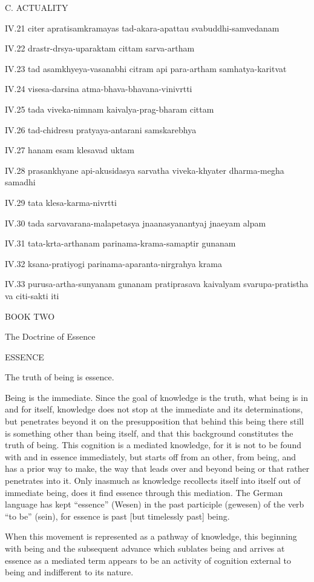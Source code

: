 

C. ACTUALITY

IV.21
citer apratisamkramayas tad-akara-apattau svabuddhi-samvedanam

IV.22
drastr-drsya-uparaktam cittam sarva-artham

IV.23
tad asamkhyeya-vasanabhi citram api para-artham samhatya-karitvat

IV.24
visesa-darsina atma-bhava-bhavana-vinivrtti

IV.25
tada viveka-nimnam kaivalya-prag-bharam cittam

IV.26
tad-chidresu pratyaya-antarani samskarebhya

IV.27
hanam esam klesavad uktam

IV.28
prasankhyane api-akusidasya sarvatha viveka-khyater dharma-megha samadhi

IV.29
tata klesa-karma-nivrtti

IV.30
tada sarvavarana-malapetasya jnaanasyanantyaj jnaeyam alpam

IV.31
tata-krta-arthanam parinama-krama-samaptir gunanam

IV.32
ksana-pratiyogi parinama-aparanta-nirgrahya krama

IV.33
purusa-artha-sunyanam gunanam pratiprasava kaivalyam
svarupa-pratistha va citi-sakti iti

BOOK TWO

The Doctrine of Essence

ESSENCE

The truth of being is essence.

Being is the immediate.
Since the goal of knowledge is the truth,
what being is in and for itself,
knowledge does not stop at the immediate and its determinations,
but penetrates beyond it on the presupposition that
behind this being there still is something other than being itself,
and that this background constitutes the truth of being.
This cognition is a mediated knowledge,
for it is not to be found with and in essence immediately,
but starts off from an other, from being,
and has a prior way to make,
the way that leads over and beyond being
or that rather penetrates into it.
Only inasmuch as knowledge recollects
itself into itself out of immediate being,
does it find essence through this mediation.
The German language has kept “essence” (Wesen)
in the past participle (gewesen) of the verb “to be” (sein),
for essence is past [but timelessly past] being.

When this movement is represented as a pathway of knowledge,
this beginning with being and the subsequent advance
which sublates being and arrives at essence as a mediated term
appears to be an activity of cognition external to being
and indifferent to its nature.

